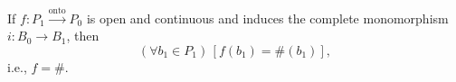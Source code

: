 If $f: P_1 \xrightarrow{\text{onto}} P_0$ is open and continuous and induces the complete monomorphism $i: B_0 \rightarrow B_1$, then
$$(\forall b_1 \in P_1)\,[f(b_1) = \#(b_1)],$$
i.e., $f = \#$.
